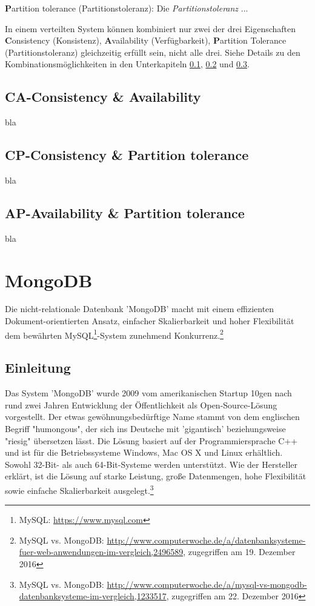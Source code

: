 \textbf{P}artition tolerance (Partitionstoleranz): Die \textit{Partitionstoleranz} ...

In einem verteilten System können kombiniert nur zwei der drei
Eigenschaften \textbf{C}onsistency (Konsistenz), \textbf{A}vailability (Verfügbarkeit), \textbf{P}artition Tolerance (Partitionstoleranz) gleichzeitig erfüllt sein, nicht alle drei. Siehe Details zu den Kombinationsmöglichkeiten in den Unterkapiteln \ref{CA}, \ref{CP} und \ref{AP}.

\subsection{\textbf{CA}-\textbf{C}onsistency \& \textbf{A}vailability}\label{CA}
bla
\subsection{\textbf{CP}-\textbf{C}onsistency \& \textbf{P}artition tolerance}\label{CP}
bla
\subsection{\textbf{AP}-\textbf{A}vailability \& \textbf{P}artition tolerance}\label{AP}
bla

\section{MongoDB}\label{mongo}
Die nicht-relationale Datenbank 'MongoDB' macht mit einem effizienten Dokument-orientierten Ansatz, einfacher Skalierbarkeit und hoher Flexibilität dem bewährten MySQL\footnote{MySQL: \url{https://www.mysql.com}}-System zunehmend Konkurrenz.\footnote{MySQL vs. MongoDB: \url{http://www.computerwoche.de/a/datenbanksysteme-fuer-web-anwendungen-im-vergleich,2496589}, zugegriffen am 19. Dezember 2016}

\subsection{Einleitung}
Das System 'MongoDB' wurde 2009 vom amerikanischen Startup 10gen nach rund zwei Jahren Entwicklung der Öffentlichkeit als Open-Source-Lösung vorgestellt. Der etwas gewöhnungsbedürftige Name stammt von dem englischen Begriff "humongous", der sich ins Deutsche mit 'gigantisch'  beziehungsweise "riesig" übersetzen lässt. Die Lösung basiert auf der Programmiersprache C++ und ist für die Betriebssysteme Windows, Mac OS X und Linux erhältlich. Sowohl 32-Bit- als auch 64-Bit-Systeme werden unterstützt. Wie der Hersteller erklärt, ist die Lösung auf starke Leistung, große Datenmengen, hohe Flexibilität sowie einfache Skalierbarkeit ausgelegt.\footnote{MySQL vs. MongoDB: \url{http://www.computerwoche.de/a/mysql-vs-mongodb-datenbanksysteme-im-vergleich,1233517}, zugegriffen am 22. Dezember 2016}

